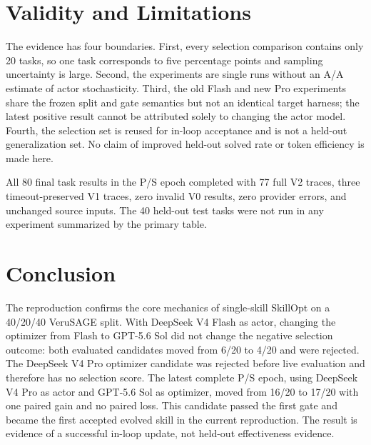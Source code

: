 \documentclass[11pt]{article}
\newcommand{\dflash}{DeepSeek V4 Flash}
\newcommand{\dpro}{DeepSeek V4 Pro}
\newcommand{\sol}{GPT-5.6 Sol}
\begin{document}
\section{Validity and Limitations}

The evidence has four boundaries. First, every selection comparison contains
only 20 tasks, so one task corresponds to five percentage points and sampling
uncertainty is large. Second, the experiments are single runs without an A/A
estimate of actor stochasticity. Third, the old Flash and new Pro experiments
share the frozen split and gate semantics but not an identical target harness;
the latest positive result cannot be attributed solely to changing the actor
model. Fourth, the selection set is reused for in-loop acceptance and is not a
held-out generalization set. No claim of improved held-out solved rate or token
efficiency is made here.

All 80 final task results in the P/S epoch completed with 77 full V2 traces,
three timeout-preserved V1 traces, zero invalid V0 results, zero provider
errors, and unchanged source inputs. The 40 held-out test tasks were not run in
any experiment summarized by the primary table.

\section{Conclusion}

The reproduction confirms the core mechanics of single-skill SkillOpt on a
40/20/40 VeruSAGE split. With \dflash{} as actor, changing the optimizer from
Flash to \sol{} did not change the negative selection outcome: both evaluated
candidates moved from 6/20 to 4/20 and were rejected. The \dpro{} optimizer
candidate was rejected before live evaluation and therefore has no selection
score. The latest complete P/S epoch, using \dpro{} as actor and \sol{} as
optimizer, moved from 16/20 to 17/20 with one paired gain and no paired loss.
This candidate passed the first gate and became the first accepted evolved
skill in the current reproduction. The result is evidence of a successful
in-loop update, not held-out effectiveness evidence.
\end{document}
